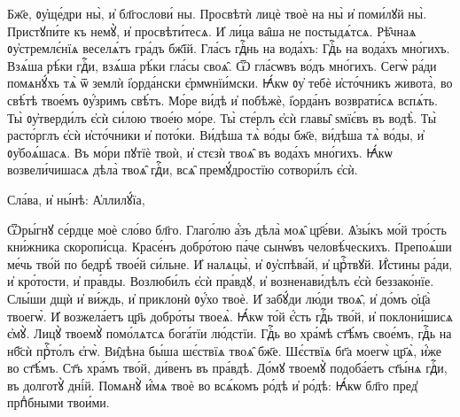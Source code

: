 \cuLettrine
Бж҃е, ᲂу҆ще́дри ны̀, и҆ бл҃гослови́ ны. 
\hKv  Просвѣтѝ лицѐ твоѐ на ны̀ и҆ поми́лꙋй ны̀. 
\hKv  Пристꙋпи́те къ немꙋ̀, и҆ просвѣти́тесѧ. 
\hKv И҆ ли́ца ва̑ша  не постыдѧ́тсѧ. 
\hKv Рѣ̑чнаѧ ᲂу҆стремлє́нїѧ веселѧ́тъ  гра́дъ бж҃їй. 
\hKv Гла́съ гдⷭ҇нь на вода́хъ: 
\hKv Гдⷭ҇ь на  вода́хъ мно́гихъ. 
\hKv Взѧ́ша рѣ́ки гдⷭ҇и, взѧ́ша рѣ́ки  гла́сы своѧ̑. 
\hKv Ѿ гла́сѡвъ во́дъ мно́гихъ. 
\hKv Сегѡ̀  ра́ди помѧнꙋ́хъ тѧ̀ ѿ землѝ і҆ѻрда́нски 
\hKv  є҆рмѡнїи́мски. 
\hKv Ꙗ҆́кѡ ᲂу҆ тебѐ и҆сто́чникъ живота̀,  во свѣ́тѣ твое́мъ ᲂу҆́зримъ свѣ́тъ. 
\hKv Мо́ре ви́дѣ и҆  побѣжѐ, і҆ѻрда́нъ возврати́сѧ вспѧ́ть. 
\hKv Ты̀  ᲂу҆тверди́лъ  є҆сѝ си́лою твое́ю  мо́ре. 
\hKv Ты̀ сте́рлъ є҆сѝ главы̑ ѕмїє́въ въ водѣ̀.  
\hKv Ты̀ расто́рглъ є҆сѝ и҆сто́чники и҆ пото́ки. 
\hKv  Ви́дѣша тѧ̀ во́ды бж҃е, ви́дѣша тѧ̀ во́ды, и҆  ᲂу҆боѧ́шасѧ. 
\hKv Въ мо́ри пꙋтїѐ твоѝ, и҆ стєзѝ твоѧ̑  въ вода́хъ мно́гихъ. 
\hKv Ꙗ҆́кѡ возвели́чишасѧ дѣла̀ твоѧ̑  гдⷭ҇и, всѧ̑ премꙋ́дростїю сотвори́лъ є҆сѝ. 

\hKv Сла́ва, и҆ ны́нѣ: А҆ллилꙋ́їа,  





\cuLettrine
Ѿры́гнꙋ се́рдце моѐ сло́во бл҃го. 
\hKv Глаго́лю  а҆́зъ дѣла̀ моѧ̑ цр҃е́ви. 
\hKv Ѧ҆зы́къ мо́й тро́сть  кни́жника скоропи́сца. 
\hKv Красе́нъ добро́тою па́че сынѡ́въ  человѣ́ческихъ. 
\hKv Препоѧ́ши  ме́чь тво́й по бедрѣ̀ твое́й си́льне. 
\hKv И҆  налѧцы̀, и҆ ᲂу҆спѣва́й, и҆ црⷭ҇твꙋй. 
\hKv И҆́стины ра́ди,  и҆ кро́тости, и҆ пра́вды. 
\hKv Возлюби́лъ є҆сѝ пра́вдꙋ, и҆  возненави́дѣлъ є҆сѝ беззако́нїе. 
\hKv Слы́ши дщѝ и҆  ви́ждь, и҆ приклонѝ ᲂу҆́хо твоѐ. 
\hKv И҆ забꙋ́ди лю́ди  твоѧ̑, и҆ до́мъ ѻ҆ц҃а̀ твоегѡ̀. 
\hKv И҆ возжела́етъ цр҃ь  добро́ты твоеѧ̀. 
\hKv Ꙗ҆́кѡ то́й є҆́сть гдⷭ҇ь тво́й, и҆  поклони́шисѧ є҆мꙋ̀. 
\hKv Лицꙋ̀ твоемꙋ̀ помо́лѧтсѧ бога́тїи  лю́дстїи. 
\hKv Гдⷭ҇ь во хра́мѣ ст҃ѣ́мъ свое́мъ, гдⷭ҇ь на  нб҃сѝ прⷭ҇то́лъ є҆гѡ̀. 
\hKv Ви̑дѣна бы́ша шє́ствїѧ твоѧ̑  бж҃е. 
\hKv Шє́ствїѧ бг҃а моегѡ̀ цр҃ѧ̀, и҆́же во ст҃ѣ́мъ.  
\hKv Ст҃ъ хра́мъ тво́й, ди́венъ въ пра́вдѣ. 
\hKv До́мꙋ  твоемꙋ̀ подоба́етъ ст҃ы́нѧ гдⷭ҇и, въ долготꙋ̀ дні́й. 
\hKv  Помѧнꙋ̀ и҆́мѧ твоѐ во всѧ́комъ ро́дѣ и҆ ро́дѣ: 
\hKv  Ꙗ҆́кѡ бл҃го пред̾ прпⷣбными твои́ми.  

